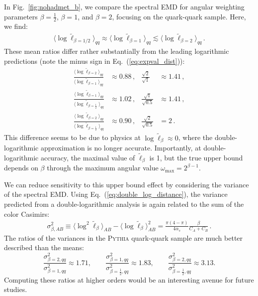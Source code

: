 \documentclass[letterpaper,11pt]{article}
\DeclareRobustCommand{\Fig}[1]{Fig.~\ref{#1}}
\DeclareRobustCommand{\Eq}[1]{Eq.~(\ref{#1})}
\begin{document}
In \Fig{fig:nohadmet_b}, we compare the spectral EMD for angular weighting parameters $\beta = \frac{1}{2}$, $\beta = 1$, and $\beta = 2$, focusing on the quark-quark sample.
%
Here, we find:
%
\begin{align}
\big\langle \log \tilde \ell_{\beta = 1/2} \big\rangle_{qq} \approx  \big\langle \log \tilde \ell_{\beta = 1} \big\rangle_{qq}  \lesssim \big\langle \log \tilde \ell_{\beta = 2} \big\rangle_{qq}\,.
\end{align}
%
These mean ratios differ rather substantially from the leading logarithmic predictions (note the minus sign in \Eq{eq:expval_dist}):
%
\begin{align}
\frac{\big\langle \log \tilde \ell_{\beta=2}\big\rangle_{qq}}{\big\langle \log \tilde \ell_{\beta=1} \big\rangle_{qq}} &\approx 0.88\,, & \frac{\sqrt{2}}{\sqrt{1}} &\approx 1.41\,,\\
\frac{\big\langle \log \tilde \ell_{\beta=1}\big\rangle_{qq}}{\big\langle \log \tilde \ell_{\beta=\frac{1}{2}}\big\rangle_{qq}} &\approx 1.02\,, & \frac{\sqrt{1}}{\sqrt{0.5}} &\approx 1.41\,,\\
\frac{\big\langle \log \tilde \ell_{\beta=2}\big\rangle_{qq}}{\big\langle \log \tilde \ell_{\beta=\frac{1}{2}}\big\rangle_{qq}} &\approx 0.90\,, & \frac{\sqrt{2}}{\sqrt{0.5}} &= 2\,.
\end{align}
%
This difference seems to be due to physics at $\log \tilde\ell_\beta \approx 0$, where the double-logarithmic approximation is no longer accurate.
%
Importantly, at double-logarithmic accuracy, the maximal value of $\tilde\ell_\beta$ is 1, but the true upper bound depends on $\beta$ through the maximum angular value $\omega_{\max}  = 2^{\beta - 1}$.


We can reduce sensitivity to this upper bound effect by considering the variance of the spectral EMD.
%
Using \Eq{eq:double_log_distance}, the variance predicted from a double-logarithmic analysis is again related to the sum of the color Casimirs:
%
\begin{align}
\sigma_{\beta,AB}^2\equiv \big\langle \log^2 \tilde \ell_\beta \big\rangle_{AB}- \big\langle \log \tilde \ell_\beta \big\rangle_{AB}^2 = \frac{\pi(4-\pi)}{4 \alpha_s} \frac{\beta}{C_A+C_B}\,.
\end{align}
%
The ratios of the variances in the \textsc{Pythia} quark-quark sample are much better described than the means:
%
\begin{equation}
\frac{\sigma_{\beta=2,qq}^2}{\sigma_{\beta=1,qq}^2} \approx 1.71, \qquad \frac{\sigma_{\beta=1,qq}^2}{\sigma_{\beta=\frac{1}{2},qq}^2} \approx 1.83, \qquad \frac{\sigma_{\beta=2,qq}^2}{\sigma_{\beta=\frac{1}{2},qq}^2} \approx 3.13.
\end{equation}
%
Computing these ratios at higher orders would be an interesting avenue for future studies.
\end{document}
